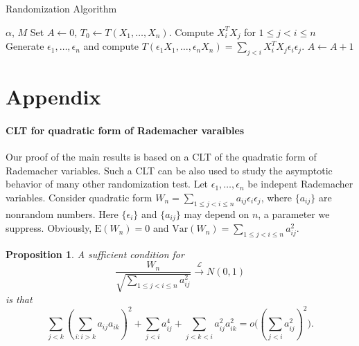 \documentclass[review]{elsarticle}
\theoremstyle{plain}
\newtheorem{proposition}{\quad\quad Proposition}
\theoremstyle{definition}
\theoremstyle{remark}
\begin{document}
\begin{algorithm}
    \caption{Randomization Algorithm}
\label{theAlgorithm}
    \begin{algorithmic}
        \REQUIRE  $\alpha$, $M$
        \STATE Set $A\gets 0$, $T_0\gets T(X_1,\ldots,X_n)$.
        \STATE Compute $X_i^T X_j$ for $1\leq j< i\leq n$
            \STATE Generate $\epsilon_1,\ldots,\epsilon_n$ and compute $T(\epsilon_1 X_1,\ldots,\epsilon_n X_n)=\sum_{j<i} X_i^T X_j\epsilon_i\epsilon_j$.
            \STATE $A\gets A+1$
            \ENDIF
            \ENDIF
            \ENDIF
        \ENDFOR
    \end{algorithmic}
\end{algorithm}



\section{Appendix}
\paragraph{CLT for quadratic form of Rademacher varaibles}
Our proof of the main results is based on a CLT of the quadratic form of Rademacher variables. 
Such a CLT can be also used to study the asymptotic behavior of many other randomization test.
 Let $\epsilon_1,\ldots,\epsilon_n$ be indepent Rademacher  variables. 
 Consider quadratic form $W_n=\sum_{1\leq j<i\leq n} a_{ij}\epsilon_i \epsilon_j$, where $\{a_{ij}\}$ are nonrandom numbers. Here $\{\epsilon_i\}$ and $\{a_{ij}\}$ may depend on $n$, a parameter we suppress.
 Obviously, $\mathrm{E}(W_n)=0$ and $\mathrm{Var}(W_n)=\sum_{1\leq j<i\leq n} a_{ij}^2$.

 \begin{proposition}\label{CLTprop}
     A sufficient condition for
     \begin{equation}
         \frac{W_n}{\sqrt{\sum_{1\leq j<i\leq n} a_{ij}^2}}\xrightarrow{\mathcal{L}} N(0,1)
     \end{equation}
     is that
     \begin{equation}
         \sum_{j<k}{(\sum_{i:i>k}a_{ij}a_{ik})}^2+
         \sum_{j<i}a_{ij}^4+
         \sum_{j<k<i}a_{ij}^2 a_{ik}^2
         =o\big({(\sum_{j<i} a_{ij}^2)}^2\big).
     \end{equation}
 \end{proposition}
\end{document}
